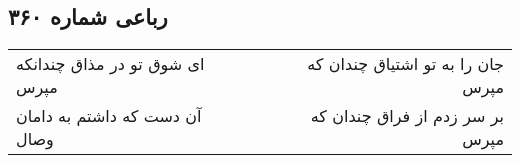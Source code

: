 \begin{center}
\section*{رباعی شماره ۳۶۰}
\label{sec:sh360}
\begin{longtable}{l p{0.5cm} r}
ای شوق تو در مذاق چندانکه مپرس
&&
جان را به تو اشتیاق چندان که مپرس
\\
آن دست که داشتم به دامان وصال
&&
بر سر زدم از فراق چندان که مپرس
\\
\end{longtable}
\end{center}

